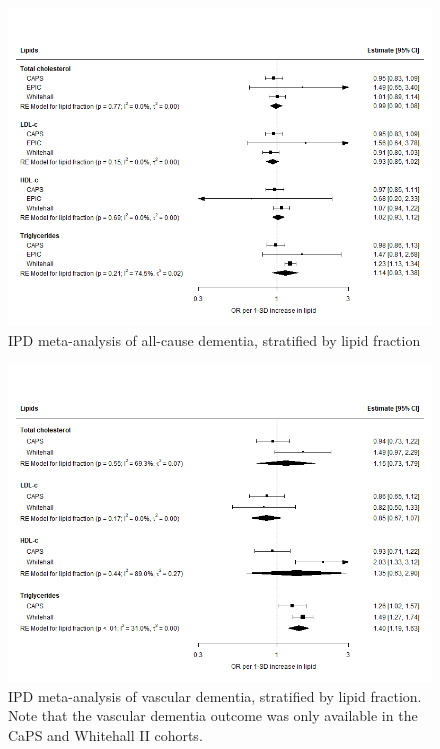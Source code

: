 \documentclass[a4paper, twoside]{templates/ociamthesis}
\begin{document}
\begin{figure}[H]
\includegraphics[width=1\linewidth]{figures/ipd/main_Dementia} \caption[IPD meta-analysis of all-cause dementia, stratified by lipid fraction]{IPD meta-analysis of all-cause dementia, stratified by lipid fraction}\label{fig:mainEffectDem}
\end{figure}





\begin{figure}[H]
\includegraphics[width=1\linewidth]{figures/ipd/main_vasdem} \caption[IPD meta-analysis of all-cause dementia, stratified by lipid fraction]{IPD meta-analysis of vascular dementia, stratified by lipid fraction. Note that the vascular dementia outcome was only available in the CaPS and Whitehall II cohorts.}\label{fig:mainEffectVad}
\end{figure}
\end{document}

